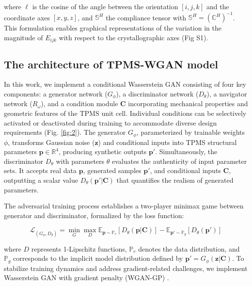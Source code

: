 \documentclass[preprint,review,12pt,authoryear]{elsarticle}
\begin{document}
where $\ell$ is the cosine of the angle between the orientation $[i,j,k]$ and the coordinate axes $[x, y, z]$, and $\mathbb{S}^H$ the compliance tensor with $\mathbb{S}^H = (\mathbb{C}^H)^{-1}$.  This formulation enables graphical representations of the variation in the magnitude of $E_{ijk}$ with respect to the crystallographic axes (Fig S1).

\subsection{The architecture of TPMS-WGAN model}
In this work, we implement a conditional Wasserstein GAN consisting of four key components: a generator network ($G_\phi$), a discriminator network ($D_\theta$), a navigator network ($R_\omega$), and a condition module $\boldsymbol{C}$ incorporating mechanical properties and geometric features of the TPMS unit cell. Individual conditions can be selectively activated or deactivated during training to accommodate diverse design requirements (Fig. \ref{fig:2}). The generator $G_\phi$, parameterized by trainable weights $\phi$, transforms Gaussian noise ($\boldsymbol{z}$) and conditional inputs into TPMS structural parameters $\boldsymbol{p} \in \mathbb{R}^4$, producing synthetic outputs $\boldsymbol{p}'$. Simultaneously, the discriminator $D_\theta$ with parameters $\theta$ evaluates the authenticity of input parameter sets. It accepts real data $\boldsymbol{p}$, generated samples $\boldsymbol{p}'$, and conditional inputs $\boldsymbol{C}$, outputting a scalar value $D_\theta(\boldsymbol{p}'|\boldsymbol{C})$ that quantifies the realism of generated parameters.

The adversarial training process establishes a two-player minimax game between generator and discriminator, formalized by the loss function:

\begin{equation}
\mathcal{L}_{(G_\phi, D_\theta)}= \min_G \max_{D} \mathbb{E}_{\boldsymbol{p} \sim \mathbb{P}_r} \left[ D_\theta(\boldsymbol{p}|\boldsymbol{C}) \right] - \mathbb{E}_{\boldsymbol{p}' \sim \mathbb{P}_g} \left[ D_\theta (\boldsymbol{p}') \right]
\label{eq:7}
\end{equation}

where $D$ represents 1-Lipschitz functions, $\mathbb{P}_r$ denotes the data distribution, and $\mathbb{P}_g$ corresponds to the implicit model distribution defined by $\boldsymbol{p}'=G_\phi(\boldsymbol{z}|\boldsymbol{C})$. To stabilize training dynamics and address gradient-related challenges, we implement Wasserstein GAN with gradient penalty (WGAN-GP) \citep{Gulrajani2017}.
\end{document}
